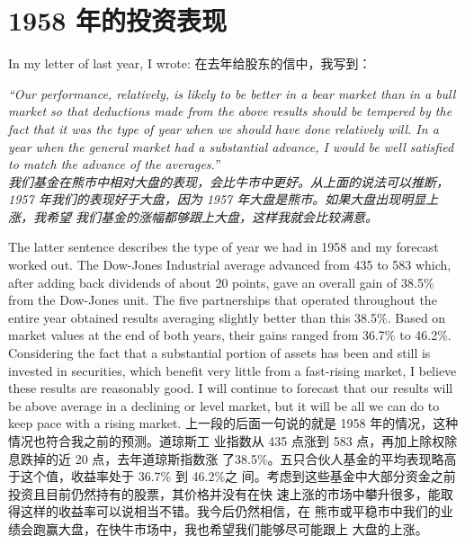 \section{1958 年的投资表现}

\begin{verseparallel}
  {
    In my letter of last year, I wrote:
  }
  {
    在去年给股东的信中，我写到：\\
  }
\end{verseparallel}

\begin{verseparallel}
    { 
      \hspace{-0.9em}
      \textit{
      “Our performance, relatively, is likely to be better in a bear market
      than in a bull market so that deductions made from the above results
      should be tempered by the fact that it was the type of year when we should
      have done relatively will. In a year when the general market had a
      substantial advance, I would be well satisfied to match the advance of the
      averages.” \\
      }
    }
    {
      \hspace{-0.6em}
      \textit{
      我们基金在熊市中相对大盘的表现，会比牛市中更好。从上面的说法可以推断，1957
      年我们的表现好于大盘，因为 1957 年大盘是熊市。如果大盘出现明显上涨，我希望
      我们基金的涨幅都够跟上大盘，这样我就会比较满意。
      }
    }
\end{verseparallel}

\begin{verseparallel}
  {
    The latter sentence describes the type of year we had in 1958 and my
    forecast worked out. The Dow-Jones Industrial average advanced from 435 to
    583 which, after adding back dividends of about 20 points, gave an overall
    gain of 38.5\% from the Dow-Jones unit. The five partnerships that operated
    throughout the entire year obtained results averaging slightly better than
    this 38.5\%. Based on market values at the end of both years, their gains
    ranged from 36.7\% to 46.2\%. Considering the fact that a substantial
    portion of assets has been and still is invested in securities, which
    benefit very little from a fast-rising market, I believe these results are
    reasonably good. I will continue to forecast that our results will be above
    average in a declining or level market, but it will be all we can do to keep
    pace with a rising market.
  }
  {
    上一段的后面一句说的就是 1958 年的情况，这种情况也符合我之前的预测。道琼斯工
    业指数从 435 点涨到 583 点，再加上除权除息跌掉的近 20 点，去年道琼斯指数涨
    了38.5\%。五只合伙人基金的平均表现略高于这个值，收益率处于 36.7\% 到 46.2\%之
    间。考虑到这些基金中大部分资金之前投资且目前仍然持有的股票，其价格并没有在快
    速上涨的市场中攀升很多，能取得这样的收益率可以说相当不错。我今后仍然相信，在
    熊市或平稳市中我们的业绩会跑赢大盘，在快牛市场中，我也希望我们能够尽可能跟上
    大盘的上涨。
  }
\end{verseparallel}
  
